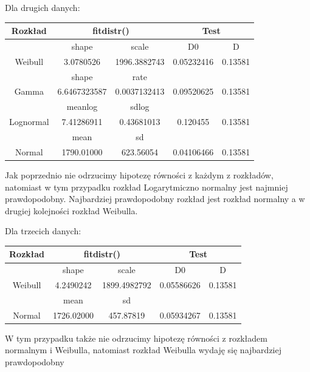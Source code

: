 \documentclass{article}
\begin{document}
Dla drugich danych:
\begin{center} \begin{tabular}{|c|c|c|c|c|} \hline
Rozkład & \multicolumn{2}{|c|}{fitdistr()} & \multicolumn{2}{|c|}{Test} \\ \hline
& shape & scale & D0 & D \\ \hline
Weibull & 3.0780526 & 1996.3882743 & 0.05232416 & 0.13581 \\ \hline
& shape & rate & & \\ \hline
Gamma & 6.6467323587 & 0.0037132413 & 0.09520625 & 0.13581 \\ \hline
& meanlog & sdlog & & \\ \hline
Lognormal & 7.41286911 & 0.43681013 & 0.120455 & 0.13581 \\ \hline
& mean & sd & & \\ \hline
Normal & 1790.01000 & 623.56054 & 0.04106466 & 0.13581 \\ \hline
\end{tabular} \end{center}
Jak poprzednio nie odrzucimy hipotezę równości z każdym z rozkładów, natomiast w tym przypadku rozkład Logarytmiczno normalny jest najmniej prawdopodobny. Najbardziej prawdopodobny rozkład jest rozkład normalny a w drugiej kolejności rozkład Weibulla. \\ \par

Dla trzecich danych:
\begin{center} \begin{tabular}{|c|c|c|c|c|} \hline
Rozkład & \multicolumn{2}{|c|}{fitdistr()} & \multicolumn{2}{|c|}{Test} \\ \hline
& shape & scale & D0 & D \\ \hline
Weibull & 4.2490242 & 1899.4982792 & 0.05586626 & 0.13581 \\ \hline
& mean & sd & & \\ \hline
Normal & 1726.02000 & 457.87819 & 0.05934267 & 0.13581 \\ \hline
\end{tabular} \end{center}
W tym przypadku także nie odrzucimy hipotezę równości z rozkładem normalnym i Weibulla, natomiast rozkład Weibulla wydaję się najbardziej prawdopodobny
\end{document}
